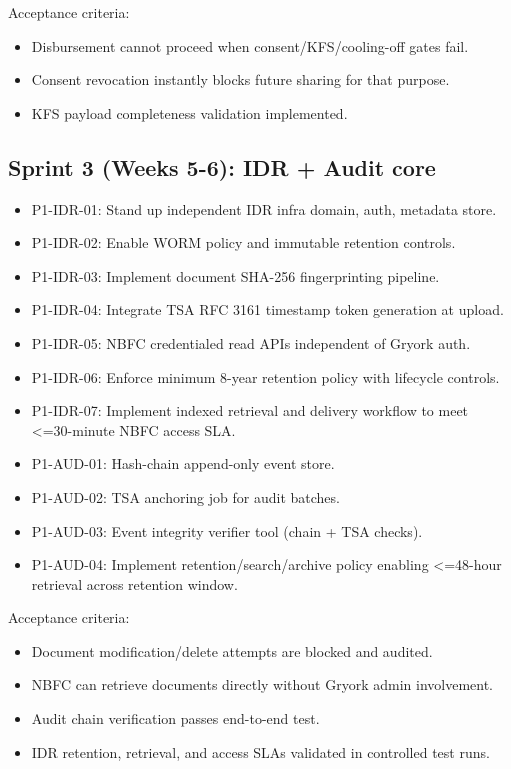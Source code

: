 ﻿\documentclass[12pt]{article}
\begin{document}
Acceptance criteria:

\begin{itemize}
\item Disbursement cannot proceed when consent/KFS/cooling-off gates fail.
\item Consent revocation instantly blocks future sharing for that purpose.
\item KFS payload completeness validation implemented.
\end{itemize}

\subsection{Sprint 3 (Weeks 5-6): IDR + Audit core}


\begin{itemize}
\item P1-IDR-01: Stand up independent IDR infra domain, auth, metadata store.
\item P1-IDR-02: Enable WORM policy and immutable retention controls.
\item P1-IDR-03: Implement document SHA-256 fingerprinting pipeline.
\item P1-IDR-04: Integrate TSA RFC 3161 timestamp token generation at upload.
\item P1-IDR-05: NBFC credentialed read APIs independent of Gryork auth.
\item P1-IDR-06: Enforce minimum 8-year retention policy with lifecycle controls.
\item P1-IDR-07: Implement indexed retrieval and delivery workflow to meet <=30-minute NBFC access SLA.
\item P1-AUD-01: Hash-chain append-only event store.
\item P1-AUD-02: TSA anchoring job for audit batches.
\item P1-AUD-03: Event integrity verifier tool (chain + TSA checks).
\item P1-AUD-04: Implement retention/search/archive policy enabling <=48-hour retrieval across retention window.
\end{itemize}

Acceptance criteria:

\begin{itemize}
\item Document modification/delete attempts are blocked and audited.
\item NBFC can retrieve documents directly without Gryork admin involvement.
\item Audit chain verification passes end-to-end test.
\item IDR retention, retrieval, and access SLAs validated in controlled test runs.
\end{itemize}
\end{document}
